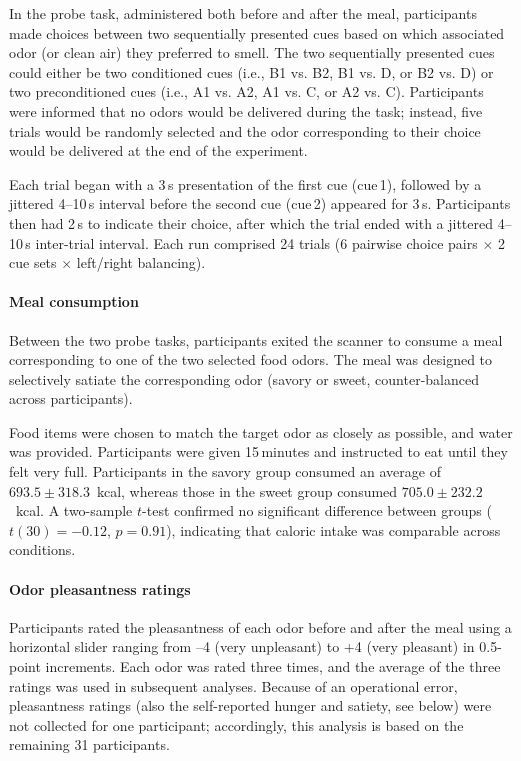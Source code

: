 \documentclass[12pt,letterpaper]{article}
\begin{document}
In the probe task, administered both before and after the meal, participants made choices between two sequentially presented cues based on which associated odor (or clean air) they preferred to smell. The two sequentially presented cues could either be two conditioned cues (i.e., B1 vs. B2, B1 vs. D, or B2 vs. D) or two preconditioned cues (i.e., A1 vs. A2, A1 vs. C, or A2 vs. C). Participants were informed that no odors would be delivered during the task; instead, five trials would be randomly selected and the odor corresponding to their choice would be delivered at the end of the experiment.


Each trial began with a 3\,s presentation of the first cue (cue\,1), followed by a jittered 4--10\,s interval before the second cue (cue\,2) appeared for 3\,s. Participants then had 2\,s to indicate their choice, after which the trial ended with a jittered 4--10\,s inter-trial interval. Each run comprised 24 trials (6 pairwise choice pairs $\times$ 2 cue sets $\times$ left/right balancing).




\paragraph*{Meal consumption}

Between the two probe tasks, participants exited the scanner to consume a meal corresponding to one of the two selected food odors. The meal was designed to selectively satiate the corresponding odor (savory or sweet, counter-balanced across participants).

Food items were chosen to match the target odor as closely as possible, and water was provided. Participants were given 15\,minutes and instructed to eat until they felt very full. Participants in the savory group consumed an average of $693.5 \pm 318.3$~kcal, whereas those in the sweet group consumed $705.0 \pm 232.2$~kcal. A two-sample $t$-test confirmed no significant difference between groups ($t(30) = -0.12$, $p = 0.91$), indicating that caloric intake was comparable across conditions.


\paragraph*{Odor pleasantness ratings}

Participants rated the pleasantness of each odor before and after the meal using a horizontal slider ranging from –4 (very unpleasant) to +4 (very pleasant) in 0.5-point increments. Each odor was rated three times, and the average of the three ratings was used in subsequent analyses. Because of an operational error, pleasantness ratings (also the self-reported hunger and satiety, see below) were not collected for one participant; accordingly, this analysis is based on the remaining 31 participants.
\end{document}
